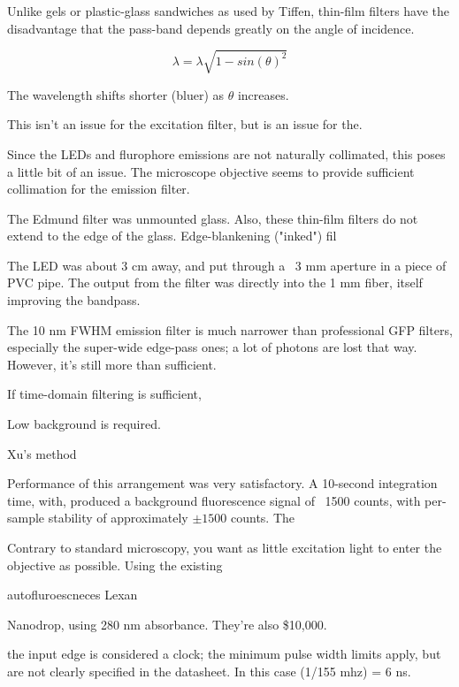 \documentclass[paper.tex]{subfiles}
\begin{document}
Unlike gels or plastic-glass sandwiches as used by Tiffen, thin-film filters have the disadvantage that the pass-band depends greatly on the angle of incidence.  

$$\lambda = \lambda \sqrt{1-sin(\theta)^2}$$

The wavelength shifts shorter (bluer) as $\theta$ increases.

This isn't an issue for the excitation filter, but is an issue for the.

Since the LEDs and flurophore emissions are not naturally collimated, this poses a little bit of an issue.
The microscope objective seems to provide sufficient collimation for the emission filter.

The Edmund filter was unmounted glass. Also, these thin-film filters do not extend to the edge of the glass. Edge-blankening ("inked") fil



The LED was about 3 cm away, and put through a ~3 mm aperture in a piece of PVC pipe. The output from the filter was directly into the 1 mm fiber, itself improving the bandpass.





The 10 nm FWHM emission filter is much narrower than professional GFP filters, especially the super-wide edge-pass ones; a lot of photons are lost that way. However, it's still more than sufficient. 






If time-domain filtering is sufficient, 

Low background is required.

Xu's method \cite{Quantification2020}

Performance of this arrangement was very satisfactory. A 10-second integration time, with, produced a background fluorescence signal of ~1500 counts, with per-sample stability of approximately $\pm 1500$ counts. The  



Contrary to standard microscopy, you want as little excitation light to enter the objective as possible. Using the existing 

autofluroescneces Lexan

Nanodrop, using 280 nm absorbance. They're also \$10,000.




the input edge is considered a clock; the minimum pulse width limits apply, but are not clearly specified in the datasheet. In this case (1/155 mhz) = 6 ns.
\end{document}
